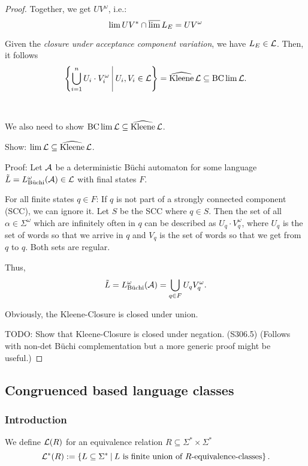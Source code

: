 \begin{lemma}
\begin{proof}
Together, we get $UV^\omega$, i.e.:
\[ \lim UV^* \cap \operatorname{\overline{lim}} L_E = UV^\omega \]

Given the \emph{closure under acceptance component variation}, we have $L_E \in \mathcal{L}$. Then, it follows
\[ \Set{ \bigcup_{i=1}^n U_i \cdot V_i^\omega}{U_i, V_i \in \Lang} = \Kleene \Lang \subseteq \BC \lim \Lang . \]

\

We also need to show $\operatorname{BC} \lim \mathcal{L} \subseteq \operatorname{\widehat{Kleene}} \mathcal{L}$.

Show: $\lim \mathcal{L} \subseteq \operatorname{\widehat{Kleene}} \mathcal{L}$.

Proof: Let $\mathcal{A}$ be a deterministic Büchi automaton for some language $\tilde L = L^\omega_{\text{Büchi}}(\mathcal{A}) \in \mathcal{L}$ with final states $F$.

For all finite states $q \in F$: If $q$ is not part of a strongly connected component (SCC), we can ignore it. Let $S$ be the SCC where $q \in S$. Then the set of all $\alpha \in \Sigma^\omega$ which are infinitely often in $q$ can be described as $U_q \cdot V_q^\omega$, where $U_q$ is the set of words so that we arrive in $q$ and $V_q$ is the set of words so that we get from $q$ to $q$. Both sets are regular.

Thus,
\[ \tilde L = L^\omega_{\text{Büchi}}(\mathcal{A}) = \bigcup_{q \in F} U_q V_q^\omega . \]

Obviously, the Kleene-Closure is closed under union.

TODO: Show that Kleene-Closure is closed under negation. (S306.5) (Follows with non-det Büchi complementation but a more generic proof might be useful.)
\end{proof}
\end{lemma}

\subsection{Congruenced based language classes}

\subsubsection{Introduction}
\label{gen:R-automata}

\begin{mydef}
We define $\mathcal{L}(R)$ for an equivalence relation $R\subseteq\Sigma^* \times \Sigma^*$
\[ \Lang^*(R) := \Set{L \subseteq \Sigma^*}{L \text{ is finite union of $R$-equivalence-classes}} . \]
\end{mydef}

